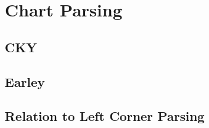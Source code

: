\chapter{Chart Parsing}
\label{cha:ChartParsing}

\section{CKY}

\section{Earley}

\section{Relation to Left Corner Parsing}
